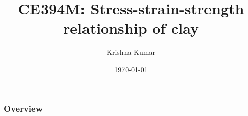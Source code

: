 \documentclass[notes]{beamer}
\title[CE394M: Stress-strain-strength]{CE394M: Stress-strain-strength relationship of clay}
\author{Krishna Kumar} %
\institute[UT Austin] %
{
University of Texas at Austin \\
\medskip
\textit{
  \url{krishnak@utexas.edu}} %
}
\date{\today} %
\begin{document}
\begin{frame}
\titlepage %
\end{frame}

\begin{frame}
 \frametitle{Overview}
 \tableofcontents
\end{frame}

\end{document}
